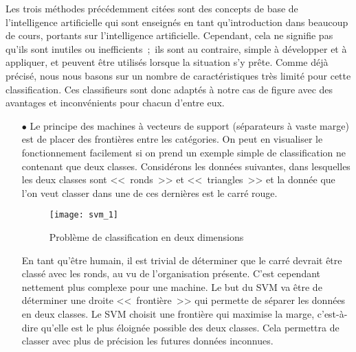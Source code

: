 Les trois méthodes précédemment citées sont des concepts de base de l'intelligence artificielle qui sont enseignés en tant qu'introduction dans beaucoup de cours, portants sur l'intelligence artificielle.
Cependant, cela ne signifie pas qu'ils sont inutiles ou inefficients~;~ils sont au contraire, simple à développer et à appliquer, et peuvent être utilisés lorsque la situation s'y prête.
Comme déjà précisé, nous nous basons sur un nombre de caractéristiques très limité pour cette classification.
Ces classifieurs sont donc adaptés à notre cas de figure avec des avantages et inconvénients pour chacun d'entre eux.
\\
\begin{itemize}
    \item[\tiny$\bullet$] Le principe des machines à vecteurs de support (séparateurs à vaste marge) est de placer des frontières entre les catégories.
    On peut en visualiser le fonctionnement facilement si on prend un exemple simple de classification ne contenant que deux classes.
    Considérons les données suivantes, dans lesquelles les deux classes sont <<~ronds~>> et <<~triangles~>> et la donnée que l'on veut classer dans une de ces dernières est le carré rouge.
    
    \FloatBarrier
    \begin{figure}[h!]
        \begin{minipage}[c]{0.5\textwidth}
            \begin{center}
                \texttt{[image: svm\_1]}
            \end{center}
        \end{minipage}\hfill
        \begin{minipage}[c]{0.5\textwidth}
            \caption{Problème de classification en deux dimensions}
            \label{figure:svm_1}
        \end{minipage}
    \end{figure}
    \FloatBarrier
    
    En tant qu'être humain, il est trivial de déterminer que le carré devrait être classé avec les ronds, au vu de l'organisation présente.
    C'est cependant nettement plus complexe pour une machine.
    Le but du SVM va être de déterminer une droite <<~frontière~>> qui permette de séparer les données en deux classes.
    Le SVM choisit une frontière qui maximise la marge, c'est-à-dire qu'elle est le plus éloignée possible des deux classes.
    Cela permettra de classer avec plus de précision les futures données inconnues.
    

\end{itemize}
